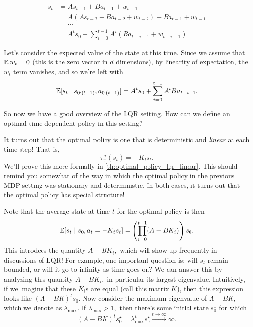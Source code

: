 \documentclass[../main/main]{subfiles}
\begin{document}
\begin{align*}
    s_t &= A s_{t-1} + B a_{t-1} + w_{t-1} \\
    &= A (As_{t-2} + B a_{t-2} + w_{t-2}) + B a_{t-1} + w_{t-1} \\
    &= \cdots \\
    &= A^t s_0 + \sum_{i=0}^{t-1} A^i (B a_{t-i-1} + w_{t-i-1})
\end{align*}

Let's consider the expected value of the state at this time.
Since we assume that $\operatorname*{\mathbb{E}} w_t = 0$ (this is the zero vector in $d$ dimensions),
by linearity of expectation, the $w_t$ term vanishes, and so we're left with \[
    \operatorname*{\mathbb{E}} [s_t \mid s_{0:(t-1)}, a_{0:(t-1)}] = A^t s_0 + \sum_{i=0}^{t-1} A^i B a_{t-i-1}.
\]

So now we have a good overview of the LQR setting.
How can we define an optimal time-dependent policy in this setting?

It turns out that the optimal policy is one that is deterministic and \emph{linear} at each time
step! That is, \[ \pi_t^\star (s_t) = - K_t s_t. \] We'll prove this more
formally in \autoref{th:optimal_policy_lqr_linear}. This should remind you somewhat of the way in which the optimal policy in
the previous MDP setting was stationary and deterministic. In both cases,
it turns out that the optimal policy has special structure!

Note that the average state at time $t$ for the optimal policy is then \[
    \operatorname*{\mathbb{E}} [s_t \mid s_0, a_t = - K_t s_t] = \left( \prod_{i=0}^{t-1} (A - B K_i) \right) s_0.
\]
This introdces the quantity $A - B K_i,$ which will show up frequently in
discussions of LQR!
For example, one important question is: will $s_t$ remain bounded,
or will it go to infinity as time goes on?
We can answer this by analyzing this quantity $A - B K_i,$ in particular its
largest eigenvalue.
Intuitively, if we imagine that these $K_i$s are equal (call this matrix $K$),
then this expression looks like $(A-BK)^t s_0.$
Now consider the maximum eigenvalue of $A - BK,$ which we denote as $\lambda_{\max}.$
If $\lambda_{\max} > 1,$ then there's some initial state $s_0^\star$
for which \[ (A - BK)^t s_0^\star = \lambda_{\max}^t s_0^\star \xrightarrow{t \to \infty} \infty. \]
\end{document}
